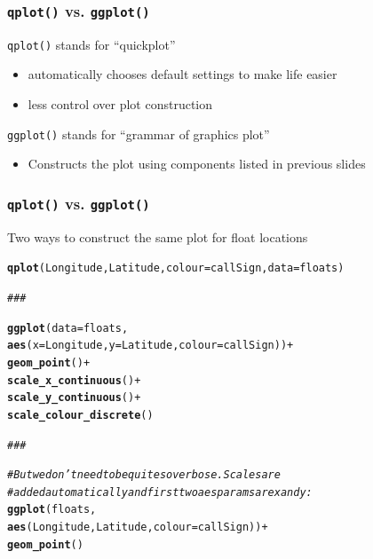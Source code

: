 \documentclass{beamer}\usepackage[]{graphicx}\usepackage[]{color}
\makeatletter
\newcommand{\hlcom}[1]{\textcolor[rgb]{0.678,0.584,0.686}{\textit{#1}}}%
\newcommand{\hlopt}[1]{\textcolor[rgb]{0,0,0}{#1}}%
\newcommand{\hlstd}[1]{\textcolor[rgb]{0.345,0.345,0.345}{#1}}%
\newcommand{\hlkwc}[1]{\textcolor[rgb]{0.333,0.667,0.333}{#1}}%
\newcommand{\hlkwd}[1]{\textcolor[rgb]{0.737,0.353,0.396}{\textbf{#1}}}%
\newenvironment{kframe}{%
 \def\at@end@of@kframe{}%
 \ifinner\ifhmode%
  \def\at@end@of@kframe{\end{minipage}}%
  \begin{minipage}{\columnwidth}%
 \fi\fi%
 \def\FrameCommand##1{\hskip\@totalleftmargin \hskip-\fboxsep
 \colorbox{shadecolor}{##1}\hskip-\fboxsep
     \hskip-\linewidth \hskip-\@totalleftmargin \hskip\columnwidth}%
 \MakeFramed {\advance\hsize-\width
   \@totalleftmargin\z@ \linewidth\hsize
   \@setminipage}}%
 {\par\unskip\endMakeFramed%
 \at@end@of@kframe}
\newenvironment{knitrout}{}{} %
\makeatother
\begin{document}
\begin{frame}[fragile]
\frametitle{\texttt{qplot()} vs. \texttt{ggplot()}}
\texttt{qplot()} stands for ``quickplot'' \medskip
\begin{itemize}
  \item automatically chooses default settings to make life easier\medskip
  \item less control over plot construction\bigskip
\end{itemize} 
    
\texttt{ggplot()} stands for ``grammar of graphics plot'' \medskip
\begin{itemize}
  \item Constructs the plot using components listed in previous slides
\end{itemize} 
\end{frame}



\begin{frame}[fragile]
\frametitle{\texttt{qplot()} vs. \texttt{ggplot()}}
Two ways to construct the same plot for float locations 
\begin{knitrout}\footnotesize
{}\color{fgcolor}\begin{kframe}
\begin{alltt}
\hlkwd{qplot}\hlstd{(Longitude, Latitude,} \hlkwc{colour}\hlstd{=callSign,} \hlkwc{data}\hlstd{=floats)}

\hlcom{###}

\hlkwd{ggplot}\hlstd{(}\hlkwc{data}\hlstd{=floats,}
       \hlkwd{aes}\hlstd{(}\hlkwc{x}\hlstd{=Longitude,} \hlkwc{y}\hlstd{=Latitude,} \hlkwc{colour}\hlstd{=callSign))} \hlopt{+}
  \hlkwd{geom_point}\hlstd{()} \hlopt{+}
  \hlkwd{scale_x_continuous}\hlstd{()} \hlopt{+}
  \hlkwd{scale_y_continuous}\hlstd{()} \hlopt{+}
  \hlkwd{scale_colour_discrete} \hlstd{()}

\hlcom{###}

\hlcom{# But we don't need to be quite so verbose.  Scales are}
\hlcom{# added automatically and first two aes params are x and y:}
\hlkwd{ggplot}\hlstd{(floats,}
       \hlkwd{aes}\hlstd{(Longitude, Latitude,} \hlkwc{colour} \hlstd{= callSign))} \hlopt{+}
  \hlkwd{geom_point}\hlstd{()}
\end{alltt}
\end{kframe}
\end{knitrout}
\end{frame}
\end{document}
